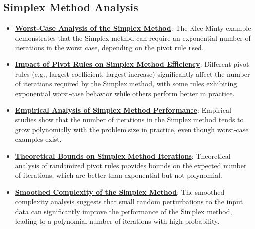 \documentclass{article}%
\begin{document}
\subsection{Simplex Method Analysis}%
\label{subsec:SimplexMethodAnalysis}%
\begin{itemize}[leftmargin=*]%
\item \href{https://www.math.purdue.edu/~yipn/421/2024-09-05-SimplexEfficiency.pdf#page=2}{\textbf{Worst-Case Analysis of the Simplex Method}}: The Klee-Minty example demonstrates that the Simplex method can require an exponential number of iterations in the worst case, depending on the pivot rule used.%
\item \href{https://www.math.purdue.edu/~yipn/421/2024-09-05-SimplexEfficiency.pdf#page=3}{\textbf{Impact of Pivot Rules on Simplex Method Efficiency}}: Different pivot rules (e.g., largest-coefficient, largest-increase) significantly affect the number of iterations required by the Simplex method, with some rules exhibiting exponential worst-case behavior while others perform better in practice.%
\item \href{https://www.math.purdue.edu/~yipn/421/2024-09-05-SimplexEfficiency.pdf#page=9}{\textbf{Empirical Analysis of Simplex Method Performance}}: Empirical studies show that the number of iterations in the Simplex method tends to grow polynomially with the problem size in practice, even though worst-case examples exist.%
\item \href{https://www.math.purdue.edu/~yipn/421/2024-09-05-SimplexEfficiency.pdf#page=10}{\textbf{Theoretical Bounds on Simplex Method Iterations}}: Theoretical analysis of randomized pivot rules provides bounds on the expected number of iterations, which are better than exponential but not polynomial.%
\item \href{https://www.math.purdue.edu/~yipn/421/2024-09-05-SimplexEfficiency.pdf#page=11}{\textbf{Smoothed Complexity of the Simplex Method}}: The smoothed complexity analysis suggests that small random perturbations to the input data can significantly improve the performance of the Simplex method, leading to a polynomial number of iterations with high probability.%
\end{itemize}

%
\end{document}
